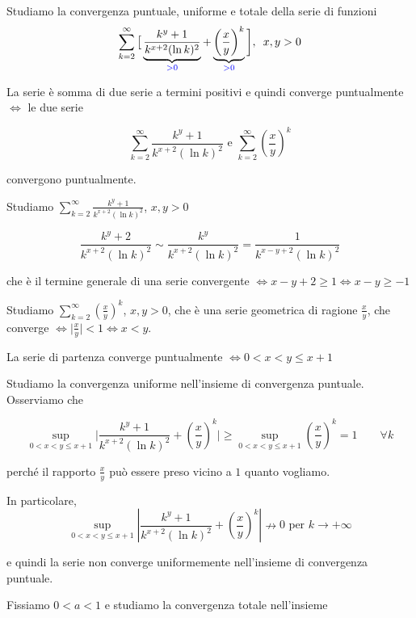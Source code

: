 \begin{exbar}
\begin{example}
	Studiamo la convergenza puntuale, uniforme e totale della serie di funzioni 
	\begin{equation*}
		\sum_{k=2}^{\infty}\big[ \underbrace{\frac{k^y+1}{k^{x+2}(\ln k)^2}}_{\color{blue}>0} + \underbrace{\left( \frac{x}{y} \right)^k}_{\color{blue}>0} \bigg], \,\,\, x,y >0
	\end{equation*} 
	
	La serie è somma di due serie a termini positivi e quindi converge puntualmente $\Leftrightarrow$ le due serie 
	
	$$\sum_{k=2}^{\infty} \frac{k^y+1}{k^{x+2}(\ln k)^2} \text{ e } \sum_{k=2}^{\infty}  \left( \frac{x}{y} \right)^k$$
	
	convergono puntualmente.
		
	Studiamo $\sum_{k=2}^{\infty} \frac{k^y+1}{k^{x+2}(\ln k)^2}$, $x,y >0$
	
	$$\frac{k^y+2}{k^{x+2}(\ln k)^2} \sim \frac{k^y}{k^{x+2}(\ln k)^2}=\frac{1}{k^{x-y+2}(\ln k)^2}$$
	
	che è il termine generale di una serie convergente $\Leftrightarrow x-y+2 \geq 1 \Leftrightarrow x-y \geq -1$
	
	Studiamo $\sum_{k=2}^{\infty} \left(\frac{x}{y}\right)^k$, $x,y>0$, che è una serie geometrica di ragione $\frac{x}{y}$, che converge $\Leftrightarrow \bigg|\frac{x}{y}\bigg|< 1 \Leftrightarrow x <y$.
	
	La serie di partenza converge puntualmente $\Leftrightarrow 0<x<y\leq x+1$


	Studiamo la convergenza uniforme nell'insieme di convergenza puntuale. Osserviamo che 
	
	$$\sup_{0<x< y\leq x+1} \bigg|\frac{k^y+1}{k^{x+2}(\ln k)^2}+\left( \frac{x}{y}\right)^k \bigg|\geq  \sup_{0<x< y\leq x+1} \left( \frac{x}{y}\right)^k=1 \qquad \forall k$$ 
	
	perché il rapporto $\frac{x}{y}$ può essere preso vicino a $1$ quanto vogliamo.
	
	In particolare, 
	$$\sup_{0<x< y\leq x+1}|\frac{k^y+1}{k^{x+2}(\ln k)^2}+\left( \frac{x}{y}\right)^k|\nrightarrow 0 \text{ per } k \rightarrow +\infty$$
	
	e quindi la serie non converge uniformemente nell'insieme di convergenza puntuale.
	
	Fissiamo $0 < a  < 1$  e studiamo la convergenza totale nell'insieme 
	

\end{example}
\end{exbar}
